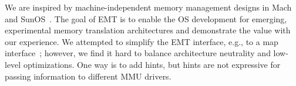 %
%

We are inspired by machine-independent memory management designs in 
    Mach~\cite{rashid1987machine} and SunOS~\cite{gingell1987sunos}.
The goal of EMT
    is to enable the OS development for emerging, experimental
    memory translation architectures and 
    demonstrate the value with our experience.
We attempted to simplify the EMT interface, e.g., to a map interface~\cite{rashid1987machine,gingell1987sunos};
	however, we find it hard to balance architecture neutrality 
	and low-level optimizations.
One way is to add hints, but 
	 hints are not expressive for passing information to different MMU drivers.


